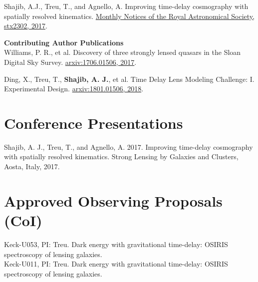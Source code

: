 \documentclass[margin,line]{res}
\begin{document}
\begin{resume}
{Shajib, A.J.}, Treu, T., and Agnello, A. Improving time-delay cosmography with spatially resolved kinematics. \href{https://doi.org/10.1093/mnras/stx2302}{Monthly Notices of the Royal Astronomical Society, stx2302, 2017}.


\textbf{Contributing Author Publications} \\
Williams, P. R., et al. Discovery of three strongly lensed quasars in the Sloan Digital Sky Survey. \href{https://arxiv.org/abs/1706.01506}{arxiv:1706.01506, 2017}.

Ding, X., Treu, T., {\bf Shajib, A. J.}, et al. Time Delay Lens Modeling Challenge: I. Experimental Design. \href{https://arxiv.org/abs/1801.01506}{arxiv:1801.01506, 2018}.



\section{\sc Conference Presentations}
Shajib, A. J., Treu, T., and Agnello, A. 2017. Improving time-delay cosmography with spatially resolved kinematics. Strong Lensing by Galaxies and Clusters, Aosta, Italy, 2017.

%

\section{\sc Approved Observing Proposals (CoI)}
Keck-U053, PI: Treu. Dark energy with gravitational time-delay: OSIRIS spectroscopy of lensing galaxies.\\
Keck-U011, PI: Treu. Dark energy with gravitational time-delay: OSIRIS spectroscopy of lensing galaxies.


\end{resume}
\end{document}
